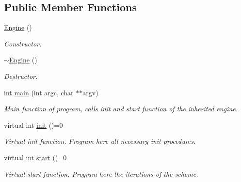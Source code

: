 \subsection*{Public Member Functions}
\begin{DoxyCompactItemize}
\item 
\mbox{\label{classEngine_a8c98683b0a3aa28d8ab72a8bcd0d52f2}} 
\mbox{\hyperlink{classEngine_a8c98683b0a3aa28d8ab72a8bcd0d52f2}{Engine}} ()
\begin{DoxyCompactList}\small\item\em Constructor. \end{DoxyCompactList}\item 
\mbox{\label{classEngine_a8ef7030a089ecb30bbfcb9e43094717a}} 
\mbox{\hyperlink{classEngine_a8ef7030a089ecb30bbfcb9e43094717a}{$\sim$\+Engine}} ()
\begin{DoxyCompactList}\small\item\em Destructor. \end{DoxyCompactList}\item 
\mbox{\label{classEngine_a8464ed1410156a3ccff819373c914297}} 
int \mbox{\hyperlink{classEngine_a8464ed1410156a3ccff819373c914297}{main}} (int argc, char $\ast$$\ast$argv)
\begin{DoxyCompactList}\small\item\em Main function of program, calls init and start function of the inherited engine. \end{DoxyCompactList}\item 
\mbox{\label{classEngine_add639334c809cd3e5c5888899df08e39}} 
virtual int \mbox{\hyperlink{classEngine_add639334c809cd3e5c5888899df08e39}{init}} ()=0
\begin{DoxyCompactList}\small\item\em Virtual init function. Program here all necessary init procedures. \end{DoxyCompactList}\item 
\mbox{\label{classEngine_a133fbaf71f1fb7a2c7eccc9f3482e923}} 
virtual int \mbox{\hyperlink{classEngine_a133fbaf71f1fb7a2c7eccc9f3482e923}{start}} ()=0
\begin{DoxyCompactList}\small\item\em Virtual start function. Program here the iterations of the scheme. \end{DoxyCompactList}\item 
$$
\end{DoxyCompactItemize}
